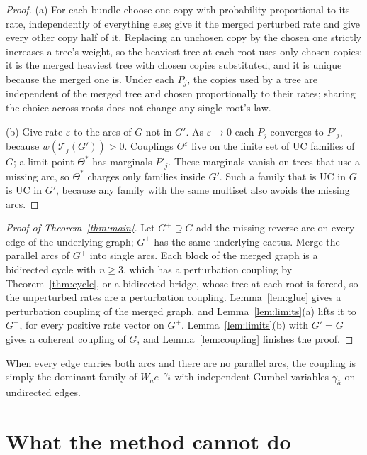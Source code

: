 \documentclass[11pt]{amsart}
\theoremstyle{definition}
\theoremstyle{remark}
\newcommand{\T}{\mathcal T}
\begin{document}
\begin{proof}
(a) For each bundle choose one copy with probability proportional to its rate, independently of everything else; give it the merged perturbed rate and give every other copy half of it. Replacing an unchosen copy by the chosen one strictly increases a tree's weight, so the heaviest tree at each root uses only chosen copies; it is the merged heaviest tree with chosen copies substituted, and it is unique because the merged one is. Under each $P_j$, the copies used by a tree are independent of the merged tree and chosen proportionally to their rates; sharing the choice across roots does not change any single root's law.

(b) Give rate $\varepsilon$ to the arcs of $G$ not in $G'$. As $\varepsilon\to0$ each $P_j$ converges to $P'_j$, because $w(\T_j(G'))>0$. Couplings $\Theta^\varepsilon$ live on the finite set of UC families of $G$; a limit point $\Theta^\ast$ has marginals $P'_j$. These marginals vanish on trees that use a missing arc, so $\Theta^\ast$ charges only families inside $G'$. Such a family that is UC in $G$ is UC in $G'$, because any family with the same multiset also avoids the missing arcs.
\end{proof}

\begin{proof}[Proof of Theorem~\ref{thm:main}]
Let $G^+\supseteq G$ add the missing reverse arc on every edge of the underlying graph; $G^+$ has the same underlying cactus. Merge the parallel arcs of $G^+$ into single arcs. Each block of the merged graph is a bidirected cycle with $n\ge3$, which has a perturbation coupling by Theorem~\ref{thm:cycle}, or a bidirected bridge, whose tree at each root is forced, so the unperturbed rates are a perturbation coupling. Lemma~\ref{lem:glue} gives a perturbation coupling of the merged graph, and Lemma~\ref{lem:limits}(a) lifts it to $G^+$, for every positive rate vector on $G^+$. Lemma~\ref{lem:limits}(b) with $G'=G$ gives a coherent coupling of $G$, and Lemma~\ref{lem:coupling} finishes the proof.
\end{proof}

When every edge carries both arcs and there are no parallel arcs, the coupling is simply the dominant family of $W_a e^{-\gamma_{\bar a}}$ with independent Gumbel variables $\gamma_{\bar a}$ on undirected edges.

\section{What the method cannot do}\label{sec:scope}
\end{document}
